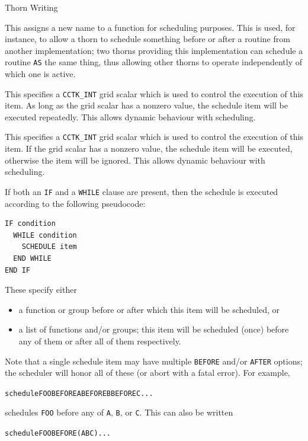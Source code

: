 \begin{cactuspart}{Thorn Writing}
\begin{Lentry}
\item[\texttt{AS}]
This assigns a new name to a function for scheduling purposes.  This
is used, for instance, to allow a thorn to schedule something before
or after a routine from another implementation;  two thorns providing this
implementation can schedule a routine \texttt{AS} the same thing, thus
allowing other thorns to operate independently of which one is active.

\item[\texttt{WHILE}]
This specifies a \texttt{CCTK\_INT} grid scalar which is used to
control the execution of this item.  As long as the grid scalar has
a nonzero value, the schedule item will be executed repeatedly.  This
allows dynamic behaviour with scheduling.

\item[\texttt{IF}]
This specifies a \texttt{CCTK\_INT} grid scalar which is used to
control the execution of this item.  If the grid scalar has a
nonzero value, the schedule item will be executed, otherwise the item
will be ignored.  This allows dynamic behaviour with scheduling.

If both an \texttt{IF} and a \texttt{WHILE} clause are present, then
the schedule is executed according to the following pseudocode:
\begin{verbatim}
IF condition
  WHILE condition
    SCHEDULE item
  END WHILE
END IF
\end{verbatim}

\item[\texttt{BEFORE} or \texttt{AFTER}]
These specify either
\begin{itemize}
\item   a function or group before or after which this item will be
        scheduled, or
\item   a list of functions and/or groups; this item will be scheduled
        (once) before any of them or after all of them respectively.
\end{itemize}
Note that a single schedule item may have multiple \texttt{BEFORE}
and/or \texttt{AFTER} options; the scheduler will honor all of these
(or abort with a fatal error).  For example,
\begin{alltt}
schedule FOO BEFORE A BEFORE B BEFORE C ...
\end{alltt}
schedules \texttt{FOO} before any of \texttt{A}, \texttt{B}, or \texttt{C}.
This can also be written
\begin{alltt}
schedule FOO BEFORE (A B C) ...
\end{alltt}


\end{Lentry}
\end{cactuspart}
